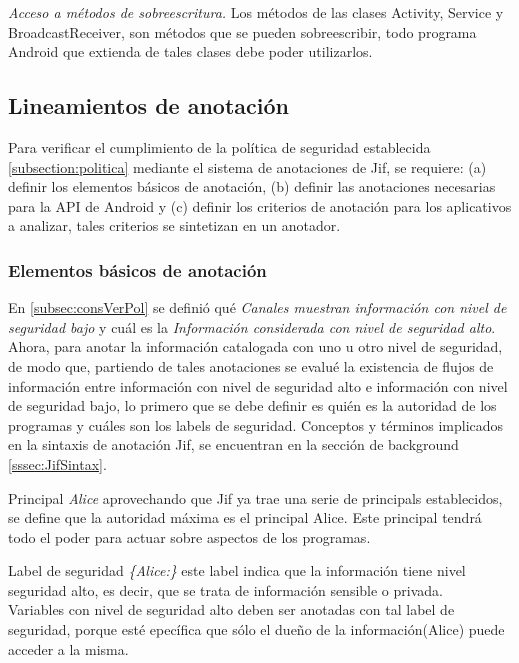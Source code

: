 \textit{Acceso a métodos de sobreescritura.}\newline
Los métodos de las clases Activity, Service y BroadcastReceiver, son métodos
que se pueden sobreescribir, todo programa Android que extienda de tales clases
debe poder utilizarlos.

\subsection{Lineamientos de anotación}
\label{subsec:linemientos}
Para verificar el cumplimiento de la política de seguridad
establecida \ref{subsection:politica} mediante el sistema de anotaciones de Jif,
se requiere: (a) definir los elementos básicos de anotación, (b) definir
las anotaciones necesarias para la API de Android y (c) definir los
criterios de anotación para los aplicativos a analizar, tales 
criterios se sintetizan en un anotador.

\subsubsection{Elementos básicos de anotación}
En \ref{subsec:consVerPol} se definió qué \textit{Canales muestran
información con nivel de seguridad bajo} y cuál es la \textit{Información
considerada con nivel de seguridad alto}. Ahora, para anotar la información
catalogada con uno u otro nivel de seguridad, de modo que, partiendo de tales
anotaciones se evalué la existencia de flujos de información entre información
con nivel de seguridad alto e información con nivel de seguridad bajo, lo primero
que se debe definir es quién es la autoridad de los programas y cuáles son los
labels de seguridad.\newline
Conceptos y términos implicados en la sintaxis de anotación Jif, se
encuentran en la sección de background \ref{sssec:JifSintax}.

Principal \emph{Alice}\newline
aprovechando que Jif ya trae una serie de principals establecidos, se define que
la autoridad máxima es el principal Alice. Este principal tendrá todo el poder
para actuar sobre aspectos de los programas.

Label de seguridad \emph{\{Alice:\}}\newline
este label indica que la información tiene nivel seguridad alto, es decir, que
se trata de información sensible o privada.\\
Variables con nivel de seguridad alto deben ser anotadas con tal label de
seguridad, porque esté epecífica que sólo el dueño de la información(Alice)
puede acceder a la misma. 

